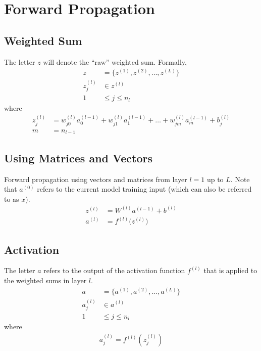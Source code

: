 \documentclass[12pt]{article}
\begin{document}
\section*{Forward Propagation}
\subsection*{Weighted Sum}
The letter $z$ will denote the ``raw'' weighted sum. Formally,
\begin{align*}
    z &= \{z^{(1)}, z^{(2)}, \ldots, z^{(L)}\}\\
    z_j^{(l)} &\in z^{(l)}\\
    1 &\leq j \leq n_l
\end{align*}
where
\begin{align*}
    z_j^{(l)} &= w_{j0}^{(l)}a_0^{(l-1)} + w_{j1}^{(l)}a_1^{(l-1)} + \ldots + w_{jm}^{(l)}a_m^{(l-1)} + b_j^{(l)}\\
    m &= n_{l-1}
\end{align*}

\subsection*{Using Matrices and Vectors}
Forward propagation using vectors and matrices from layer $l=1$ up to $L$. Note that $a^{(0)}$ refers to the current model training input (which can also be referred to as $x$).
\begin{align*}
    z^{(l)} &= W^{(l)}a^{(l-1)}+b^{(l)}\\
    a^{(l)} &= f^{(l)} \big( z^{(l)} \big)
\end{align*}

\subsection*{Activation}
The letter $a$ refers to the output of the activation function $f^{(l)}$ that is applied to the weighted sums in layer $l$.
\begin{align*}
    a &= \{a^{(1)}, a^{(2)}, \ldots, a^{(L)}\}\\
    a_j^{(l)} &\in a^{(l)}\\
    1 &\leq j \leq n_l
\end{align*}
where
\begin{align*}
    a_j^{(l)} = f^{(l)}(z_j^{(l)})
\end{align*}
\end{document}
